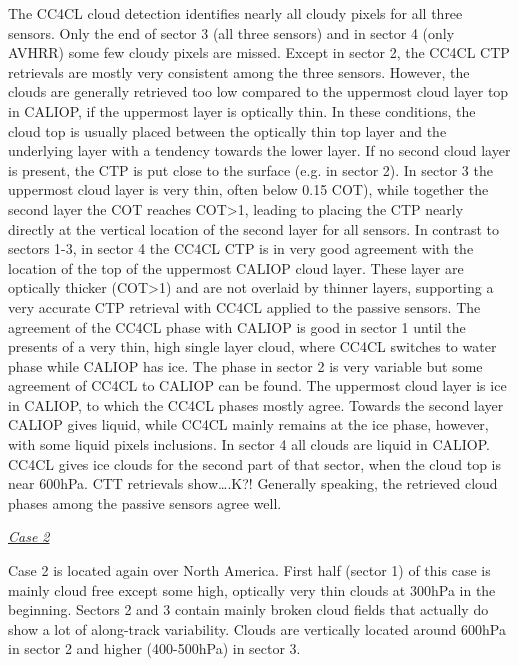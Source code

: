 {The CC4CL cloud detection identifies nearly all cloudy pixels for all three sensors. Only the end of sector 3 (all three sensors) and in sector 4 (only AVHRR) some few cloudy pixels are missed. Except in sector 2, the CC4CL CTP retrievals are mostly very consistent among the three sensors. However, the clouds are generally retrieved too low compared to the uppermost cloud layer top in CALIOP, if the uppermost layer is optically thin. In these conditions, the cloud top is usually placed between the optically thin top layer and the underlying layer with a tendency towards the lower layer. If no second cloud layer is present, the CTP is put close to the surface (e.g. in sector 2). In sector 3 the uppermost cloud layer is very thin, often below 0.15 COT), while together the second layer the COT reaches COT>1, leading to placing the CTP nearly directly at the vertical location of the second layer for all sensors.
In contrast to sectors 1-3, in sector 4 the CC4CL CTP is in very good agreement with the location of the top of the uppermost CALIOP cloud layer. These layer are optically thicker (COT>1) and are not overlaid by thinner layers, supporting a very accurate CTP retrieval with CC4CL applied to the passive sensors.
The agreement of the CC4CL phase with CALIOP is good in sector 1 until the presents of a very thin, high single layer cloud, where CC4CL switches to water phase while CALIOP has ice. The phase in sector 2 is very variable but some agreement of CC4CL to CALIOP can be found. The uppermost cloud layer is ice in CALIOP, to which the CC4CL phases mostly agree. Towards the second layer CALIOP gives liquid, while CC4CL mainly remains at the ice phase, however, with some liquid pixels inclusions. In sector 4 all clouds are liquid in CALIOP. CC4CL gives ice clouds for the second part of that sector, when the cloud top is near 600hPa. CTT retrievals show….K?! Generally speaking, the retrieved cloud phases among the passive sensors agree well.

\vspace{5mm}\underline{\textit{Case 2}}\vspace{2mm}

Case 2 is located again over North America. First half (sector 1) of this case is mainly cloud free except some high, optically very thin clouds at 300hPa in the beginning. Sectors 2 and 3 contain mainly broken cloud fields that actually do show a lot of along-track variability. Clouds are vertically located around 600hPa in sector 2 and higher (400-500hPa) in sector 3.

}
